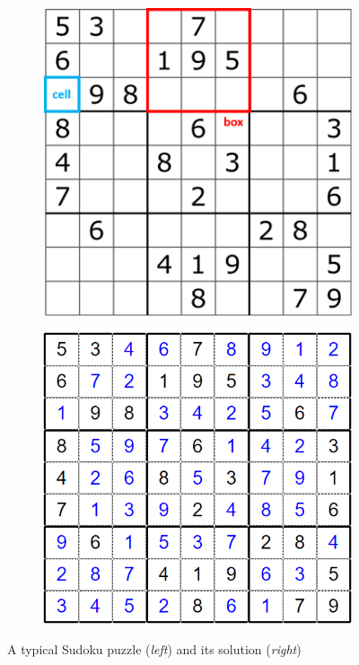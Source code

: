 \documentclass[12pt,a4paper]{article}
\begin{document}
	\begin{figure}[H]
		\centering
		\begin{subfigure}{.5\textwidth}
			\centering
			\includegraphics[height=0.8\linewidth]{9x9_puzzle}
		\end{subfigure}%
		\begin{subfigure}{.5\textwidth}
			\centering
			\includegraphics[height=0.8\linewidth]{9x9_solution}
		\end{subfigure}
		\caption{A typical Sudoku puzzle (\textsl{left}) and its solution (\textsl{right})}
		\label{fig:standard-Sudoku-puzzle}
	\end{figure}
\end{document}
